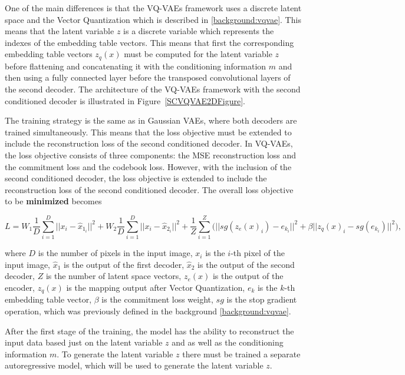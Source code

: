 One of the main differences is that the VQ-VAEs framework uses a discrete
latent space and the Vector Quantization which is described in \autoref{background:vqvae}. This means that the latent variable $z$ is a discrete variable which represents the indexes of the embedding table vectors. This means that first the corresponding embedding table vectors $z_q(x)$ must be computed for the latent variable $z$ before flattening and concatenating it with the conditioning information $m$ and then using a fully connected layer before the transposed convolutional layers of the second decoder. The architecture of the VQ-VAEs framework with the second conditioned decoder is illustrated in Figure~\ref{SCVQVAE2DFigure}.

The training strategy is the same as in Gaussian VAEs, where both decoders are trained simultaneously. This means that the loss objective must be extended to include the reconstruction loss of the second conditioned decoder. In VQ-VAEs, the loss objective consists of three components: the MSE
reconstruction loss and the commitment loss and the codebook loss. However,
with the inclusion of the second conditioned decoder, the loss objective is
extended to include the reconstruction loss of the second conditioned decoder.
The overall loss objective to be \textbf{minimized} becomes

\[ L = W_1 \frac{1}{D} \sum_{i=1}^{D} ||x_i - \hat{x}_{1_{i}} ||^2 +  W_2 \frac{1}{D} \sum_{i=1}^{D} || x_i - \hat{x}_{2_{i}} ||^2 + \frac{1}{Z} \sum_{i=1}^{Z} \biggl( || sg(z_e(x)_i) - e_{k_i} ||^2 + \beta || z_q(x)_i - sg(e_{k{_i}}) ||^2 \biggr) , \]


where $D$ is the number of pixels in the input image, $x_i$ is the $i$-th pixel
of the input image, $\hat{x}_1$ is the output of the first decoder, $\hat{x}_2$
is the output of the second decoder, $Z$ is the number of latent space vectors,
$z_e(x)$ is the output of the encoder, $z_q(x)$ is the mapping output after
Vector Quantization, $e_k$ is the $k$-th embedding table vector, $\beta$ is the
commitment loss weight, $sg$ is the stop gradient operation, which was
previously defined in the background \autoref{background:vqvae}.

After the first stage of the training, the model has the ability to reconstruct
the input data based just on the latent variable $z$ and as well as the
conditioning information $m$. To generate the latent variable $z$ there must be
trained a separate autoregressive model, which will be used to generate the
latent variable $z$.

